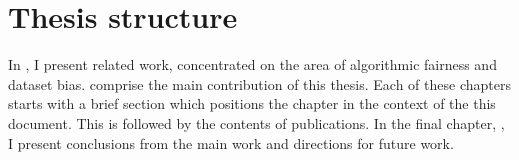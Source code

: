 \section{Thesis structure}%
\label{sec:thesis-structure}
In , I present related work,
concentrated on the area of algorithmic fairness and dataset bias.
 comprise the main contribution of this thesis.
Each of these chapters starts with a brief section which positions the chapter in the context of the this document.
This is followed by the contents of publications.
In the final chapter, , I present conclusions from the main work and directions for future work.
